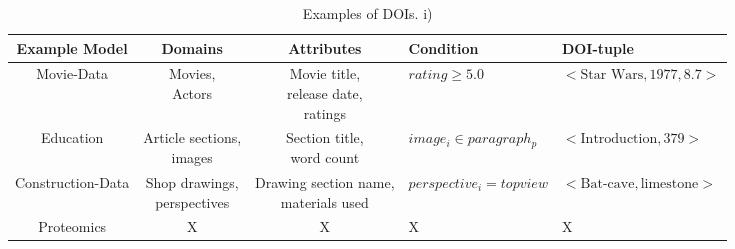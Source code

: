 \begin{table*}[htbp]
	\centering
		\begin{tabular}{|c|c|c|l|l|}
			\hline
	Example Model & Domains & Attributes & Condition& DOI-tuple\\\hline
	Movie-Data & \shortstack{Movies,\\ Actors} & \shortstack{Movie title,\\ release date,\\ ratings}& $rating \geq 5.0$& $<\text{Star Wars}, 1977, 8.7>$ \\\hline
	Education & \shortstack{Article sections,\\ images} & \shortstack{Section title,\\ word count} & $image_i \in paragraph_p$& $<\text{Introduction}, 379>$ \\\hline
	Construction-Data & \shortstack{Shop drawings,\\ perspectives} & \shortstack{Drawing section name,\\ materials used} & $perspective_i =topview$& $<\text{Bat-cave}, \text{limestone}>$ \\\hline
	Proteomics & X& X& X& X \\\hline
		\end{tabular}
		\caption{Examples of DOIs. i)}
		\label{tab:ExampleDOI}
\end{table*}







